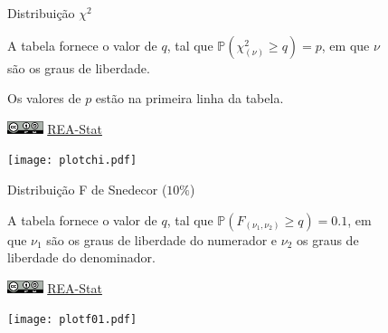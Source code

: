 \documentclass[12pt]{article}
\begin{document}
\newpage


\begin{landscape}

\begin{figure}[h]
\begin{minipage}[c]{1\textwidth}

\begin{Huge}
Distribuição $\chi^2$
\end{Huge}

\vspace{2em}

A tabela fornece o valor de $q$, tal que $\mathbb{P}(\chi^2_{(\nu)} \geq q) = p$, em que $\nu$ são os graus de liberdade.

Os valores de $p$ estão na primeira linha da tabela.
\par\bigskip
\href{https://creativecommons.org/licenses/by-sa/4.0/deed.pt_BR}{\includegraphics[height=1em]{cc-by-sa.pdf}}
\href{https://rea-stat.github.io}{REA-Stat}
\end{minipage}
\hfill
\begin{minipage}[c]{.30\textwidth}
\texttt{[image: plotchi.pdf]}
\end{minipage}
\end{figure}  



\end{landscape}


\newpage


\begin{landscape}

\begin{figure}[h]
\begin{minipage}[c]{1\textwidth}

\begin{Huge}
Distribuição F de Snedecor ($10\%$)
\end{Huge}

\vspace{2em}

A tabela fornece o valor de $q$, tal que $\mathbb{P}(F_{(\nu_1, \nu_2)} \geq q) = 0.1$, em que $\nu_1$ são os graus de liberdade do numerador e $\nu_2$ os graus de liberdade do denominador. 
\par\bigskip
\href{https://creativecommons.org/licenses/by-sa/4.0/deed.pt_BR}{\includegraphics[height=1em]{cc-by-sa.pdf}}
\href{https://rea-stat.github.io}{REA-Stat}
\end{minipage}
\hfill
\begin{minipage}[c]{.33\textwidth}
\texttt{[image: plotf01.pdf]}
\end{minipage}
\end{figure}  



\end{landscape}
\end{document}
